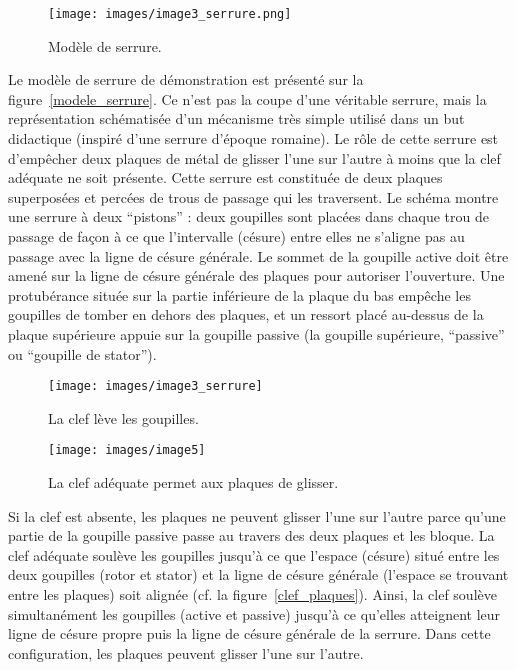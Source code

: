 \documentclass[a4paper,french,11pt,twoside]{report}
\begin{document}
\begin{figure}[ht]
  \begin{center}
    \texttt{[image: images/image3\_serrure.png]}
    \caption{Modèle de serrure.\label{modele_serrure}}
  \end{center}
\end{figure}


Le modèle de serrure de démonstration est présenté sur la figure~\vref{modele_serrure}. Ce n'est pas la coupe d'une véritable serrure, mais la représentation schématisée d'un mécanisme très simple utilisé dans un but didactique (inspiré d'une serrure d'époque romaine). Le rôle de cette serrure est d'empêcher deux plaques de métal de glisser l'une sur l'autre à moins que la clef adéquate ne soit présente. Cette serrure est constituée de deux plaques superposées et percées de trous de passage qui les traversent. Le schéma montre une serrure à deux \enquote{pistons} : deux goupilles sont placées dans chaque trou de passage de façon à ce que l'intervalle (césure) entre elles ne s'aligne pas au passage avec la ligne de césure générale. Le sommet de la goupille active doit être amené sur la ligne de césure générale des plaques pour autoriser l'ouverture. Une protubérance située sur la partie inférieure de la plaque du bas empêche les goupilles de tomber en dehors des plaques, et un ressort placé au-dessus de la plaque supérieure appuie sur la goupille passive (la goupille supérieure, \enquote{passive} ou \enquote{goupille de stator}).

\begin{figure}[ht]
  \begin{center}
    \texttt{[image: images/image3\_serrure]}
    \caption{La clef lève les goupilles.\label{clef_leve_goupilles}}
  \end{center}
\end{figure}

\begin{figure}[ht]
  \begin{center}
    \texttt{[image: images/image5]}
    \caption{La clef adéquate permet aux plaques de glisser.\label{clef_plaques}}
  \end{center}
\end{figure}

Si la clef est absente, les plaques ne peuvent glisser l'une sur l'autre parce qu'une partie de la goupille passive passe au travers des deux plaques et les bloque. La clef adéquate soulève les goupilles jusqu'à ce que l'espace (césure) situé entre les deux goupilles (rotor et stator) et la ligne de césure générale (l'espace se trouvant entre les plaques) soit alignée (cf. la figure~\vref{clef_plaques}). Ainsi, la clef soulève simultanément les goupilles (active et passive) jusqu'à ce qu'elles atteignent leur ligne de césure propre puis la ligne de césure générale de la serrure. Dans cette configuration, les plaques peuvent glisser l'une sur l'autre.
\end{document}
